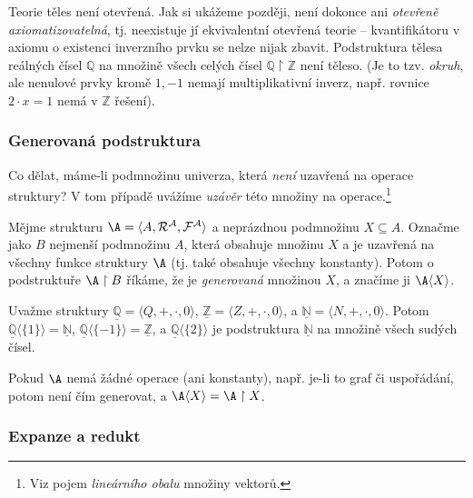 \begin{example}
    Teorie těles není otevřená. Jak si ukážeme později, není dokonce ani \emph{otevřeně axiomatizovatelná}, tj. neexistuje jí ekvivalentní otevřená teorie -- kvantifikátoru v axiomu o existenci inverzního prvku se nelze nijak zbavit. Podstruktura tělesa reálných čísel $\mathbb Q$ na množině všech celých čísel $\mathbb Q\restriction\mathbb Z$ není těleso. (Je to tzv. \emph{okruh}, ale nenulové prvky kromě $1,-1$ nemají multiplikativní inverz, např. rovnice $2\cdot x=1$ nemá v $\mathbb Z$ řešení).
\end{example}

\subsubsection{Generovaná podstruktura}

Co dělat, máme-li podmnožinu univerza, která \emph{není} uzavřená na operace struktury? V tom případě uvážíme \emph{uzávěr} této množiny na operace.\footnote{Viz pojem \emph{lineárního obalu} množiny vektorů.}

\begin{definition}
    Mějme strukturu $\A=\langle A,\mathcal R^\mathcal A,\mathcal F^\mathcal A\rangle$ a neprázdnou podmnožinu $X\subseteq A$. Označme jako $B$ nejmenší podmnožinu $A$, která obsahuje množinu $X$ a je uzavřená na všechny funkce struktury $\A$ (tj. také obsahuje všechny konstanty). Potom o podstruktuře $\A\restriction B$ říkáme, že je \emph{generovaná} množinou $X$, a značíme ji $\A\langle X\rangle$.
\end{definition}

\begin{example}
    Uvažme struktury $\underline{\mathbb Q}=\langle Q,+,\cdot,0\rangle$, $\underline{\mathbb Z}=\langle Z,+,\cdot,0\rangle$, a $\underline{\mathbb N}=\langle N,+,\cdot,0\rangle$. Potom $\underline{\mathbb Q}\langle\{1\}\rangle=\underline{\mathbb N}$, $\underline{\mathbb Q}\langle\{-1\}\rangle=\underline{\mathbb Z}$, a $\underline{\mathbb Q}\langle\{2\}\rangle$ je podstruktura $\underline{\mathbb N}$ na množině všech sudých čísel.
\end{example}

\begin{example}
    Pokud $\A$ nemá žádné operace (ani konstanty), např. je-li to graf či uspořádání, potom není čím generovat, a $\A\langle X\rangle=\A\restriction X$.
\end{example}

\subsubsection{Expanze a redukt}

